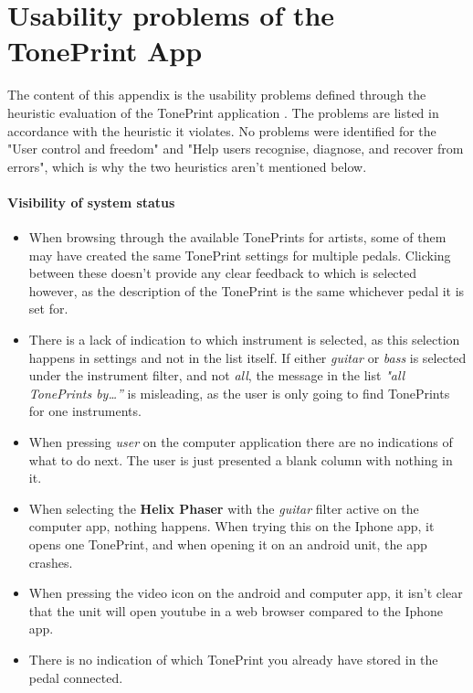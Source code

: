 \chapter{Usability problems of the TonePrint App}
\label{AppendixHeuristics}
The content of this appendix is the usability problems defined through the heuristic evaluation of the TonePrint application . The problems are listed in accordance with the heuristic it violates. No problems were identified for the "User control and freedom" and "Help users recognise, diagnose, and recover from errors", which is why the two heuristics aren't mentioned below.

\subsubsection{Visibility of system status}
\begin{itemize}
	\item When browsing through the available TonePrints for artists, some of them may have created the same TonePrint settings for multiple pedals. Clicking between these doesn’t provide any clear feedback to which is selected however, as the description of the TonePrint is the same whichever pedal it is set for.\\
	\item There is a lack of indication to which instrument is selected, as this selection happens in settings and not in the list itself. If either \textit{guitar} or \textit{bass} is selected under the instrument filter, and not \textit{all}, the message in the list \textit{"all TonePrints by…”} is misleading, as the user is only going to find TonePrints for one instruments.\\
	\item When pressing \textit{user} on the computer application there are no indications of what to do next. The user is just presented a blank column with nothing in it.\\
	\item When selecting the \textbf{Helix Phaser} with the \textit{guitar} filter active on the computer app, nothing happens. When trying this on the Iphone app, it opens one TonePrint, and when opening it on an android unit, the app crashes.\\
	\item When pressing the video icon on the android and computer app, it isn't clear that the unit will open youtube in a web browser compared to the Iphone app.\\
	\item There is no indication of which TonePrint you already have stored in the pedal connected. 
\end{itemize}
%
